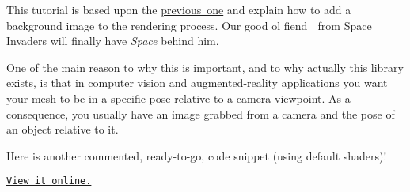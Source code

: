 This tutorial is based upon the \mbox{\hyperlink{tutorial_superimpose}{previous one}} and explain how to add a background image to the rendering process. Our good ol\textquotesingle{} fiend 👾 from Space Invaders will finally have {\itshape Space} behind him.

 One of the main reason to why this is important, and to why actually this library exists, is that in computer vision and augmented-\/reality applications you want your mesh to be in a specific pose relative to a camera viewpoint. As a consequence, you usually have an image grabbed from a camera and the pose of an object relative to it.

Here is another commented, ready-\/to-\/go, code snippet (using default shaders)!~\newline


\href{https://github.com/robotology/superimpose-mesh-lib/blob/master/doc/tutorial_code/tutorial_background.cpp}{\tt View it online.} 
